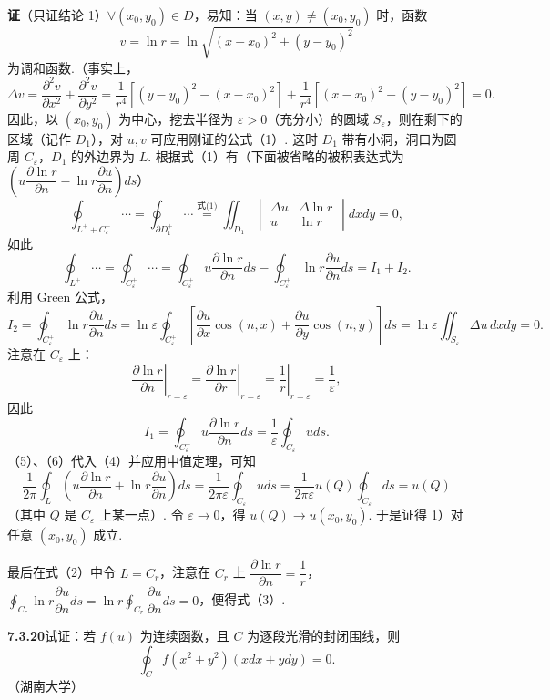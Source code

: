 \documentclass[UTF8, 12pt, fontset=fandol, oneside]{ctexart}
\begin{document}
\noindent\textbf{证}\quad （只证结论 1）$\forall(x_0,y_0)\in D$，易知：当 $(x,y)\ne(x_0,y_0)$ 时，函数
\[
v=\ln r=\ln\sqrt{(x-x_0)^2+(y-y_0)^2}
\]
为调和函数.（事实上，
\[
\Delta v=\frac{\partial^2v}{\partial x^2}+\frac{\partial^2v}{\partial y^2}
=\frac1{r^4}[(y-y_0)^2-(x-x_0)^2]
+\frac1{r^4}[(x-x_0)^2-(y-y_0)^2]=0.
\]
因此，以 $(x_0,y_0)$ 为中心，挖去半径为 $\varepsilon>0$（充分小）的圆域 $S_\varepsilon$，则在剩下的区域（记作 $D_1$），对 $u,v$ 可应用刚证的公式（1）. 这时 $D_1$ 带有小洞，洞口为圆周 $C_\varepsilon$，$D_1$ 的外边界为 $L$. 根据式（1）有（下面被省略的被积表达式为 $\left(u\dfrac{\partial\ln r}{\partial n}-\ln r\dfrac{\partial u}{\partial n}\right)ds$）
\[
\oint_{L^++C_\varepsilon^-}\cdots
=\oint_{\partial D_1^+}\cdots
\overset{\text{式(1)}}{=}
\iint_{D_1}
\begin{vmatrix}
\Delta u & \Delta\ln r\\
u & \ln r
\end{vmatrix}dxdy=0,
\]
如此
\[
\oint_{L^+}\cdots=\oint_{C_\varepsilon^+}\cdots
=\oint_{C_\varepsilon^+}u\frac{\partial\ln r}{\partial n}ds
-\oint_{C_\varepsilon^+}\ln r\frac{\partial u}{\partial n}ds=I_1+I_2.
\tag{4}
\]
利用 Green 公式，
\[
I_2=\oint_{C_\varepsilon^+}\ln r\frac{\partial u}{\partial n}ds
=\ln\varepsilon\oint_{C_\varepsilon^+}
\left[\frac{\partial u}{\partial x}\cos(n,x)
+\frac{\partial u}{\partial y}\cos(n,y)\right]ds
=\ln\varepsilon\iint_{S_\varepsilon}\Delta u\,dxdy=0.
\tag{5}
\]
注意在 $C_\varepsilon$ 上：
\[
\left.\frac{\partial\ln r}{\partial n}\right|_{r=\varepsilon}
=\left.\frac{\partial\ln r}{\partial r}\right|_{r=\varepsilon}
=\left.\frac1r\right|_{r=\varepsilon}=\frac1\varepsilon,
\]
因此
\[
I_1=\oint_{C_\varepsilon^+}u\frac{\partial\ln r}{\partial n}ds
=\frac1\varepsilon\oint_{C_\varepsilon}uds.
\tag{6}
\]
（5）、（6）代入（4）并应用中值定理，可知
\[
\frac1{2\pi}\oint_L\left(u\frac{\partial\ln r}{\partial n}
+\ln r\frac{\partial u}{\partial n}\right)ds
=\frac1{2\pi\varepsilon}\oint_{C_\varepsilon}uds
=\frac1{2\pi\varepsilon}u(Q)\oint_{C_\varepsilon}ds=u(Q)
\]
（其中 $Q$ 是 $C_\varepsilon$ 上某一点）. 令 $\varepsilon\to0$，得 $u(Q)\to u(x_0,y_0)$. 于是证得 1）对任意 $(x_0,y_0)$ 成立.

最后在式（2）中令 $L=C_r$，注意在 $C_r$ 上 $\dfrac{\partial\ln r}{\partial n}=\dfrac1r$，$\displaystyle\oint_{C_r}\ln r\dfrac{\partial u}{\partial n}ds=\ln r\oint_{C_r}\dfrac{\partial u}{\partial n}ds=0$，便得式（3）.

\noindent\textbf{7.3.20}\quad 试证：若 $f(u)$ 为连续函数，且 $C$ 为逐段光滑的封闭围线，则
\[
\oint_Cf(x^2+y^2)(xdx+ydy)=0.
\]
（湖南大学）
\end{document}
